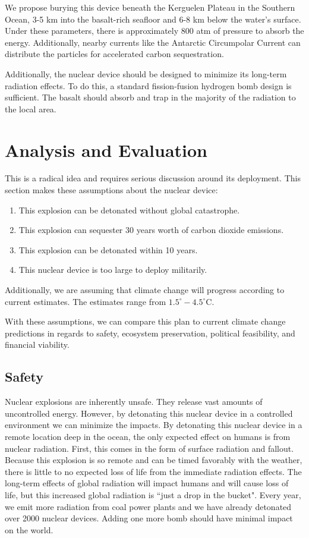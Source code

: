 \documentclass[11pt]{article}
\begin{document}
We propose burying this device beneath the Kerguelen Plateau in the Southern Ocean, 3-5 km into the basalt-rich seafloor and 6-8 km below the water's surface. Under these parameters, there is approximately 800 atm of pressure to absorb the energy. Additionally, nearby currents like the Antarctic Circumpolar Current can distribute the particles for accelerated carbon sequestration.

Additionally, the nuclear device should be designed to minimize its long-term radiation effects. To do this, a standard fission-fusion hydrogen bomb design is sufficient. The basalt should absorb and trap in the majority of the radiation to the local area.



\section{Analysis and Evaluation}

This is a radical idea and requires serious discussion around its deployment. This section makes these assumptions about the nuclear device:

\begin{enumerate}
    \item This explosion can be detonated without global catastrophe.
    \item This explosion can sequester 30 years worth of carbon dioxide emissions.
    \item This explosion can be detonated within 10 years.
    \item This nuclear device is too large to deploy militarily.
\end{enumerate}



Additionally, we are assuming that climate change will progress according to current estimates. The estimates range from $1.5^{\circ}-4.5^{\circ}$C.


With these assumptions, we can compare this plan to current climate change predictions in regards to safety, ecosystem preservation, political feasibility, and financial viability.



\subsection{Safety}
Nuclear explosions are inherently unsafe. They release vast amounts of uncontrolled energy. However, by detonating this nuclear device in a controlled environment we can minimize the impacts. By detonating this nuclear device in a remote location deep in the ocean, the only expected effect on humans is from nuclear radiation. First, this comes in the form of surface radiation and fallout. Because this explosion is so remote and can be timed favorably with the weather, there is little to no expected loss of life from the immediate radiation effects. The long-term effects of global radiation will impact humans and will cause loss of life, but this increased global radiation is ``just a drop in the bucket". Every year, we emit more radiation from coal power plants and we have already detonated over 2000 nuclear devices. Adding one more bomb should have minimal impact on the world.
\end{document}
